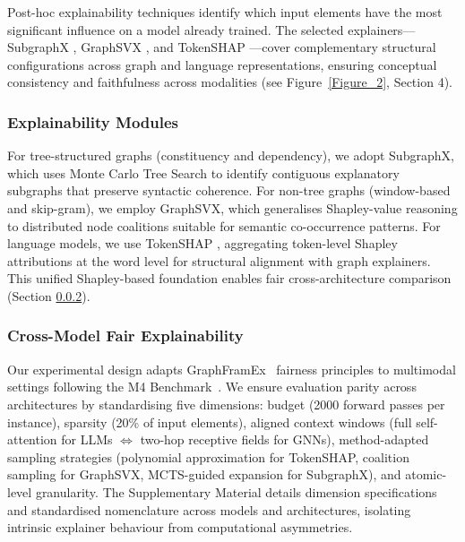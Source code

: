 \documentclass[preprint, times, review, 10pt]{elsarticle}
\begin{document}
Post-hoc explainability techniques identify which input elements have the most significant influence on a model already trained. The selected explainers—SubgraphX \cite{yuan2021explainabilitygraphneuralnetworks}, GraphSVX \cite{duval2021graphsvxshapleyvalueexplanations}, and TokenSHAP \cite{goldshmidt2024tokenshapinterpretinglargelanguage}—cover complementary structural configurations across graph and language representations, ensuring conceptual consistency and faithfulness across modalities (see Figure~\ref{Figure_2}, Section 4).

\subsubsection{Explainability Modules}

For tree-structured graphs (constituency and dependency), we adopt SubgraphX, which uses Monte Carlo Tree Search to identify contiguous explanatory subgraphs that preserve syntactic coherence. For non-tree graphs (window-based and skip-gram), we employ GraphSVX, which generalises Shapley-value reasoning to distributed node coalitions suitable for semantic co-occurrence patterns. For language models, we use TokenSHAP , aggregating token-level Shapley attributions at the word level for structural alignment with graph explainers. This unified Shapley-based foundation enables fair cross-architecture comparison (Section \ref{sec:crossfair}).
 
\subsubsection{Cross-Model Fair Explainability} \label{sec:crossfair}
 
Our experimental design adapts GraphFramEx~\cite{amara2022graphframex} fairness principles to multimodal settings following the M4 Benchmark~\cite{10.5555/3666122.3666203}. We ensure evaluation parity across architectures by standardising five dimensions: budget (2000 forward passes per instance), sparsity (20\% of input elements), aligned context windows (full self-attention for LLMs $\Leftrightarrow$ two-hop receptive fields for GNNs), method-adapted sampling strategies (polynomial approximation for TokenSHAP, coalition sampling for GraphSVX, MCTS-guided expansion for SubgraphX), and atomic-level granularity. The Supplementary Material details dimension specifications and standardised nomenclature across models and architectures, isolating intrinsic explainer behaviour from computational asymmetries.
\end{document}
